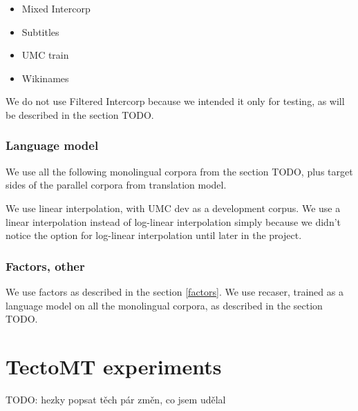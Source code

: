 \begin{itemize}
\item Mixed Intercorp
\item Subtitles
\item UMC train
\item Wikinames
\end{itemize}

We do not use Filtered Intercorp because we intended it only for testing, as will be described in the section TODO.

\subsubsection{Language model}

We use all the following monolingual corpora from the section TODO, plus target sides of the parallel corpora from translation model.

We use linear interpolation, with UMC dev as a development corpus. We use a linear interpolation instead of log-linear interpolation simply because we didn't notice the option for log-linear interpolation until later in the project.

\subsubsection{Factors, other}
We use factors as described in the section \ref{factors}. We use recaser, trained as a language model on all the monolingual corpora, as described in the section TODO.


\section{TectoMT experiments}
TODO: hezky popsat těch pár změn, co jsem udělal
